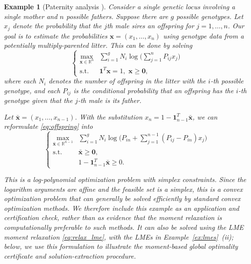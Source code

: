 \documentclass[pdflatex,sn-mathphys-num]{sn-jnl}%
\newcommand{\re}{\mathbb{R}}
\newcommand{\vect}[1]{\boldsymbol{#1}}
\newcommand{\st}{\mathrm{s.t.}}
\theoremstyle{thmstyleone}%
\theoremstyle{thmstyletwo}%
\newtheorem{example}{Example}%
\theoremstyle{thmstylethree}%
\begin{document}
\begin{example}[Paternity analysis \cite{McCulloch87}] 
	\label{ex:offspring}
	Consider a single genetic locus involving a single mother 
	and $n$ possible fathers.
	Suppose there are $g$ possible genotypes.
	Let $x_j$ denote the probability that the $j$th male sires an
	offspring for $j=1,\ldots,n$.
	Our goal is to estimate the probabilities $\vect{x}=(x_1,\ldots, x_n)$ 
	using genotype data from a potentially multiply-parented litter.
	This can be done by solving 
	\begin{equation}\label{eq:offspring}
		\left\{\begin{array}{cl}
			\max\limits_{\vect{x}\in\re^n} & \sum\limits_{i=1}^{g} N_i \log \Big( \sum\limits_{j=1}^n P_{ij}x_j \Big)\\
			\st & \mathbf{1}^T\vect{x} = 1,\,\, \vect{x} \geq \mathbf{0},
		\end{array}\right.
	\end{equation}
	where each $N_i$ denotes the number of offspring in the litter with 
	the $i$-th possible genotype,
	and each $P_{ij}$ is the conditional probability that an offspring
	has the $i$-th genotype given that the $j$-th male is its father.

	Let $\vect{\bar{x}} = (x_1,\ldots, x_{n-1})$.
	With the substitution $x_n = 1-\mathbf{1}_{n-1}^T\vect{\bar{x}}$, 
	we can reformulate \eqref{eq:offspring} into 
	\begin{equation}\label{eq:offspring_updated}
		\left\{\begin{array}{cl}
			\max\limits_{\vect{\bar{x}}\in\re^{n-1}} & \sum\limits_{i=1}^{g} N_i\log\Big(
			P_{in}+\sum\limits_{j=1}^{n-1}(P_{ij}-P_{in})x_j\Big)\\
			\st &  \vect{\bar{x}}\geq \mathbf{0},\\
			& 1-\mathbf{1}_{n-1}^T\vect{\bar{x}}\ge 0.
		\end{array}
		\right.
	\end{equation}

This is a log-polynomial optimization problem with simplex constraints.
Since the logarithm arguments are affine and the feasible set is
a simplex, this is a convex optimization problem that can generally
be solved efficiently by standard convex optimization methods. We
therefore include this example as an application and certification
check, rather than as evidence that the moment relaxation is
computationally preferable to such methods.
It can also be solved using the LME moment relaxation
\eqref{eq:relax_lme}, with the LMEs in
Example~\ref{ex:lmes}~(ii); below, we use this formulation to
illustrate the moment-based global optimality certificate and
solution-extraction procedure.


\end{example}
\end{document}
